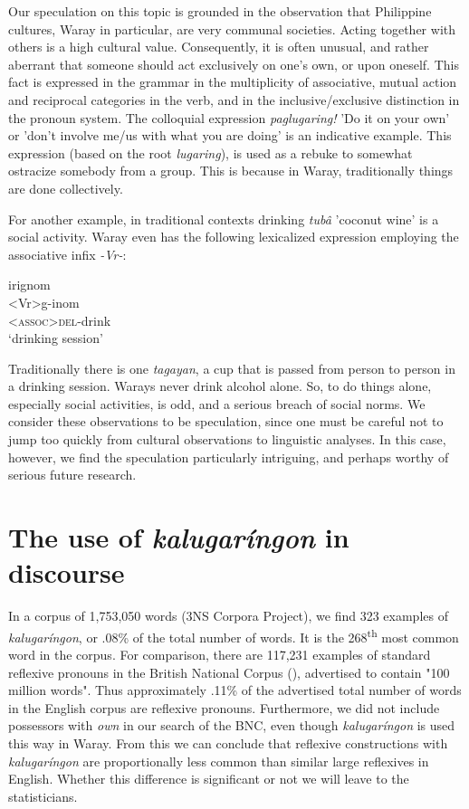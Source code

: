 \documentclass[output=paper]{langscibook}
\begin{document}
Our speculation on this topic is grounded in the observation that Philippine cultures, Waray in particular, are very communal societies. Acting together with others is a high cultural value. Consequently, it is often unusual, and rather aberrant that someone should act exclusively on one's own, or upon oneself. This fact is expressed in the grammar in the multiplicity of associative, mutual action and reciprocal categories in the verb, and in the inclusive/exclusive distinction in the pronoun system. The colloquial expression \textit{paglugaring!} 'Do it on your own' or 'don't involve me/us with what you are doing' is an indicative example. This expression (based on the root \textit{lugaring}), is used as a rebuke to somewhat ostracize somebody from a group. This is because in Waray, traditionally things are done collectively. 

For another example, in traditional contexts drinking \textit{tubâ} 'coconut wine' is a social activity. Waray even has the following lexicalized expression employing the associative infix \textit{\nobreakdash-Vr-}:

\ea
\label{ex:Payne:36}
\glll irignom \\
<Vr>g-inom\\
\textsc{<assoc}>\textsc{del}-drink\\
\glt ‘drinking session' 
\z

Traditionally there is one \textit{tagayan}, a cup that is passed from person to person in a drinking session. Warays never drink alcohol alone. So, to do things alone, especially social activities, is odd, and a serious breach of social norms. We consider these observations to be speculation, since one must be careful not to jump too quickly from cultural observations to linguistic analyses. In this case, however, we find the speculation particularly intriguing, and perhaps worthy of serious future research.

\section{The use of \textit{kalugaríngon} in discourse}
\label{sec:Payne:10}

In a corpus of 1,753,050 words (3NS Corpora Project), we find 323 examples of \textit{kalugaríngon}, or .08\% of the total number of words. It is the 268\textsuperscript{th} most common word in the corpus. For comparison, there are 117,231 examples of standard reflexive pronouns in the British National Corpus (\citealt{Davies2004}), advertised to contain "100 million words". Thus approximately .11\% of the advertised total number of words in the English corpus are reflexive pronouns. Furthermore, we did not include possessors with \textit{own} in our search of the BNC, even though \textit{kalugaríngon} is used this way in Waray. From this we can conclude that reflexive constructions with \textit{kalugaríngon} are proportionally less common than similar large reflexives in English. Whether this difference is significant or not we will leave to the statisticians.
\end{document}
